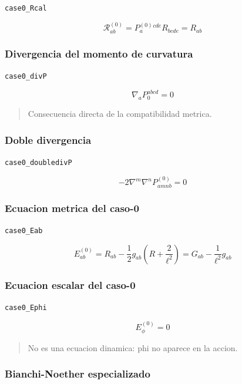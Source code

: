 \documentclass[11pt,a4paper]{article}
\begin{document}
\noindent\texttt{case0\_Rcal}\par\nopagebreak[4]

\[
\mathcal R^{(0)}_{ab}=P^{(0)}_a{}^{cde}R_{bcde} = R_{ab}
\]

\subsubsection{Divergencia del momento de curvatura}

\noindent\texttt{case0\_divP}\par\nopagebreak[4]

\[
\nabla_aP_0^{abcd} = 0
\]

\begin{quote}\small Consecuencia directa de la compatibilidad metrica.\end{quote}

\subsubsection{Doble divergencia}

\noindent\texttt{case0\_doubledivP}\par\nopagebreak[4]

\[
-2\nabla^m\nabla^nP^{(0)}_{amnb} = 0
\]

\subsubsection{Ecuacion metrica del caso-0}

\noindent\texttt{case0\_Eab}\par\nopagebreak[4]

\[
E^{(0)}_{ab} = R_{ab}-\frac12g_{ab}\left(R+\frac{2}{\ell^2}\right)=G_{ab}-\frac{1}{\ell^2}g_{ab}
\]

\subsubsection{Ecuacion escalar del caso-0}

\noindent\texttt{case0\_Ephi}\par\nopagebreak[4]

\[
E^{(0)}_\phi = 0
\]

\begin{quote}\small No es una ecuacion dinamica: phi no aparece en la accion.\end{quote}

\subsubsection{Bianchi-Noether especializado}
\end{document}
